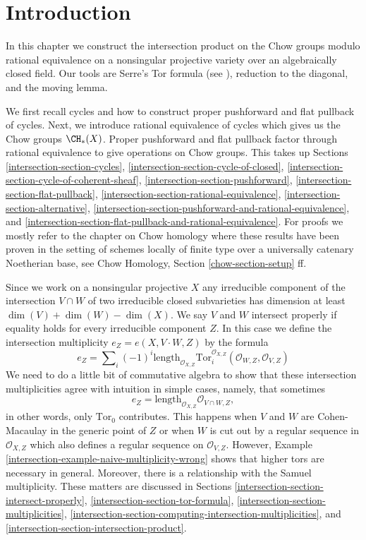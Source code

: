 \section{Introduction}
\label{intersection-section-introduction}
In this chapter we construct the intersection product on the Chow groups
modulo rational equivalence on a nonsingular projective variety over an
algebraically closed field. Our tools are Serre's Tor formula
(see \cite[Chapter V]{Serre_algebre_locale}), reduction to the diagonal,
and the moving lemma.

\medskip\noindent
We first recall cycles and how to construct proper pushforward and
flat pullback of cycles. Next, we introduce rational equivalence of cycles
which gives us the Chow groups $\CH_*(X)$. Proper pushforward and flat pullback
factor through rational equivalence to give operations on Chow groups.
This takes up Sections
\ref{intersection-section-cycles},
\ref{intersection-section-cycle-of-closed},
\ref{intersection-section-cycle-of-coherent-sheaf},
\ref{intersection-section-pushforward},
\ref{intersection-section-flat-pullback},
\ref{intersection-section-rational-equivalence},
\ref{intersection-section-alternative},
\ref{intersection-section-pushforward-and-rational-equivalence}, and
\ref{intersection-section-flat-pullback-and-rational-equivalence}.
For proofs we mostly refer to the chapter on Chow homology
where these results have been proven in the setting of
schemes locally of finite type over a universally catenary Noetherian base, see
Chow Homology, Section \ref{chow-section-setup} ff.

\medskip\noindent
Since we work on a nonsingular projective $X$ any irreducible component
of the intersection $V \cap W$ of two irreducible closed subvarieties
has dimension at least $\dim(V) + \dim(W) - \dim(X)$. We say $V$ and $W$
intersect properly if equality holds for every irreducible component $Z$.
In this case we define the intersection multiplicity
$e_Z = e(X, V \cdot W, Z)$ by the formula
$$
e_Z = \sum\nolimits_i
(-1)^i
\text{length}_{\mathcal{O}_{X, Z}}
\text{Tor}_i^{\mathcal{O}_{X, Z}}(\mathcal{O}_{W, Z}, \mathcal{O}_{V, Z})
$$
We need to do a little bit of commutative algebra to show that these
intersection multiplicities agree with intuition in simple cases,
namely, that sometimes
$$
e_Z = \text{length}_{\mathcal{O}_{X, Z}} \mathcal{O}_{V \cap W, Z},
$$
in other words, only $\text{Tor}_0$ contributes. This happens when
$V$ and $W$ are Cohen-Macaulay in the generic point of $Z$ or when
$W$ is cut out by a regular sequence in $\mathcal{O}_{X, Z}$ which
also defines a regular sequence on $\mathcal{O}_{V, Z}$. However,
Example \ref{intersection-example-naive-multiplicity-wrong} shows that higher
tors are necessary in general. Moreover, there is a relationship
with the Samuel multiplicity. These matters are discussed in
Sections
\ref{intersection-section-intersect-properly},
\ref{intersection-section-tor-formula},
\ref{intersection-section-multiplicities},
\ref{intersection-section-computing-intersection-multiplicities}, and
\ref{intersection-section-intersection-product}.

